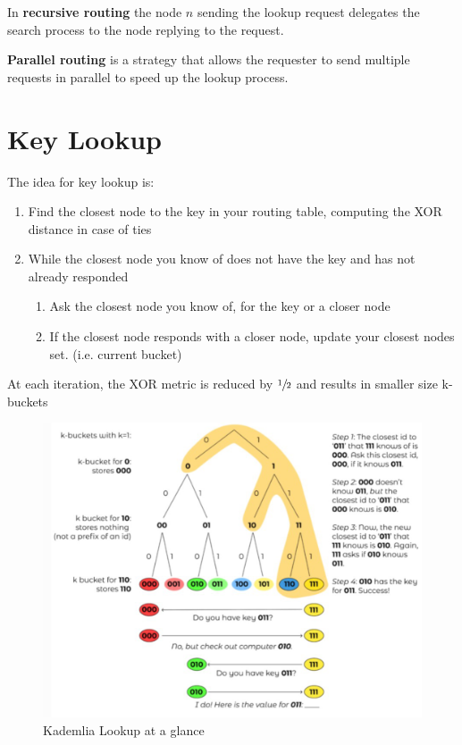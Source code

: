 In \textbf{recursive routing} the node $n$ sending the lookup request delegates the search process to the node replying to the request.

\textbf{Parallel routing} is a strategy that allows the requester to send multiple requests in parallel to speed up the lookup process.

\section{Key Lookup}

{The idea for key lookup is:\ns
\begin{enumerate}
   \item Find the closest node to the key in your routing table, computing the XOR distance in case of ties
   \item While the closest node you know of does not have the key and has not already responded
   \begin{enumerate}
      \item Ask the closest node you know of, for the key or a closer node
      \item If the closest node responds with a closer node, update your closest nodes set. (i.e. current bucket)
   \end{enumerate}
\end{enumerate}}
At each iteration, the XOR metric is reduced by $\sfrac{1}{2}$ and results in smaller size k-buckets

\begin{figure}[htbp]
   \centering
   \includegraphics{images/kademlia_lookup.png}
   \caption{Kademlia Lookup at a glance}
   \label{fig:kademlia_lookup}
\end{figure}

